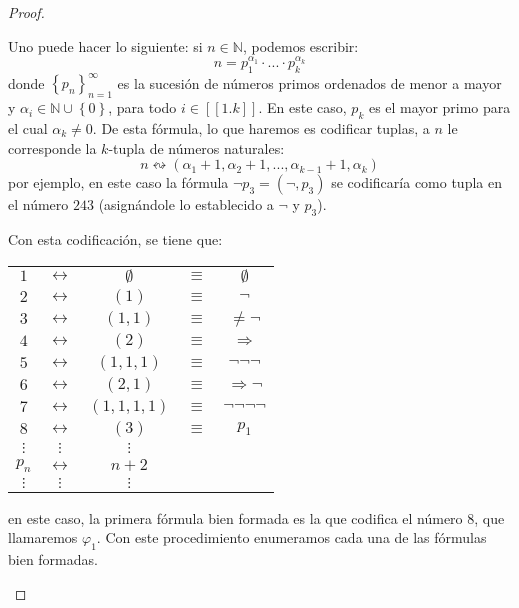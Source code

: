 \documentclass[12pt]{report}
\newcounter{it}
\theoremstyle{largebreak}
\newcommand\natint[1]{\ensuremath{\left[\!\left[ #1\right]\!\right]}}
\newcounter{tablec}
\begin{document}
\begin{proof}
\begin{itemize}
            Uno puede hacer lo siguiente: si $n\in\mathbb{N}$, podemos escribir:
            \begin{equation*}
                n=p_1^{\alpha_1}\cdot...\cdot p_k^{\alpha_k}
            \end{equation*}
            donde $\left\{p_n \right\}_{ n=1}^\infty$ es la sucesión de números primos ordenados de menor a mayor y $\alpha_i\in\mathbb{N}\cup\left\{0\right\}$, para todo $i\in\natint{1.k}$. En este caso, $p_k$ es el mayor primo para el cual $\alpha_k\neq0$. De esta fórmula, lo que haremos es codificar tuplas, a $n$ le corresponde la $k$-tupla de números naturales:
            \begin{equation*}
                n\leftrightsquigarrow (\alpha_1+1,\alpha_2+1,...,\alpha_ {k-1}+1,\alpha_k)
            \end{equation*}
            por ejemplo, en este caso la fórmula $\neg p_3=(\neg,p_3)$ se codificaría como tupla en el número $243$ (asignándole lo establecido a $\neg$ y $p_3$).

            Con esta codificación, se tiene que:
            \begin{center}
                \begin{tabular}{ccccc}
                    $1$ & $\longleftrightarrow$ & $\emptyset$ & $\equiv$ & $\emptyset$ \\
                    $2$ & $\longleftrightarrow$ & $(1)$ & $\equiv$ & $\neg$ \\
                    $3$ & $\longleftrightarrow$ & $(1,1)$ & $\equiv$ & $\ne\neg$ \\
                    $4$ & $\longleftrightarrow$ & $(2)$ & $\equiv$ & $\Rightarrow$ \\
                    $5$ & $\longleftrightarrow$ & $(1,1,1)$ & $\equiv$ & $\neg\neg\neg$ \\
                    $6$ & $\longleftrightarrow$ & $(2,1)$ & $\equiv$ & $\Rightarrow\neg$ \\
                    $7$ & $\longleftrightarrow$ & $(1,1,1,1)$ & $\equiv$ & $\neg\neg\neg\neg$ \\
                    $8$ & $\longleftrightarrow$ & $(3)$ & $\equiv$ & $p_1$ \\
                    $\vdots$ & $\vdots$ & $\vdots$ \\
                    $p_n$ & $\longleftrightarrow$ & $n+2$ \\
                    $\vdots$ & $\vdots$ & $\vdots$ \\
                \end{tabular}
            \end{center}
            en este caso, la primera fórmula bien formada es la que codifica el número 8, que llamaremos $\varphi_1$. Con este procedimiento enumeramos cada una de las fórmulas bien formadas.


\end{itemize}
\end{proof}
\end{document}
